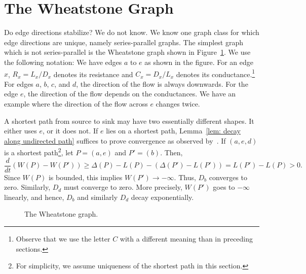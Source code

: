 \documentclass[11pt,a4paper]{article}
\renewcommand{\source}{\ensuremath{s_0}}
\renewcommand{\sink}{\ensuremath{s_1}}
\begin{document}
\section{The Wheatstone Graph}\label{sec: Wheatstone}



Do edge directions stabilize? We do not know. We know one graph class for which
edge directions are unique, namely series-parallel graphs. The simplest graph
which is not series-parallel is the Wheatstone graph shown in 
Figure~\ref{fig:wheatstone}. We use the following notation: 
We have edges $a$ to $e$ as shown in the figure. For an edge $x$, 
$R_x = L_x/D_x$ denotes its resistance and $C_x = D_x/L_x$ denotes its
conductance.\footnote{Observe that we use the letter $C$ with a different meaning
than in preceding sections.} For edges $a$, $b$, $c$, and $d$, the direction of the flow is
always downwards. For the edge $e$, the direction of the flow depends on the
conductances. We have an example where the direction of the flow across $e$
changes twice. 

A shortest path from source to sink may have two essentially different shapes. It
either uses $e$, or it does not. If $e$ lies on a shortest path, Lemma~\ref{lem: decay along
undirected path} suffices to prove convergence as observed
by~\cite{Miyaji-Ohnishi}. If $(a,e,d)$ is a shortest path\footnote{For
simplicity, we assume uniqueness of the shortest path in this section.},
let $P = (a,e)$ and $P' = (b)$. Then, 
\[ \frac{d}{dt} (W(P) - W(P')) \ge \Delta(P) - L(P) - (\Delta(P') - L(P')) = L(P')
- L(P) > 0.\]
Since $W(P)$ is bounded, this implies $W(P') \rightarrow -\infty$. Thus, $D_b$
converges to zero. Similarly, $D_d$ must converge to zero. More precisely,
$W(P')$ goes to $-\infty$ linearly, and hence, $D_b$ and similarly $D_d$ decay
exponentially. 

\begin{figure}[t]
\begin{center}
\end{center}
\caption{\label{fig:wheatstone} The Wheatstone graph.}
\end{figure}
\end{document}
